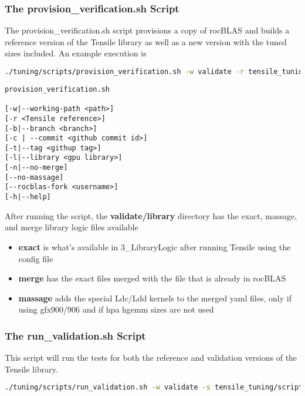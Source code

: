 \documentclass[]{article}
\begin{document}
\subsubsection{The provision\_verification.sh Script}

The provision\_verification.sh script provisions a copy of rocBLAS and builds a reference version of the Tensile library as well as a new version with the tuned sizes included. An example execution is

\begin{lstlisting}[language=bash,breaklines=true]
./tuning/scripts/provision_verification.sh -w validate -r tensile_tuning/tensile/Tensile -l vega20
\end{lstlisting}

\begin{verbatim}
provision_verification.sh

[-w|--working-path <path>]
[-r <Tensile reference>]
[-b|--branch <branch>]
[-c | --commit <github commit id>]
[-t|--tag <githup tag>]
[-l|--library <gpu library>]
[-n|--no-merge]
[--no-massage]
[--rocblas-fork <username>]
[-h|--help]
\end{verbatim}

After running the script, the \textbf{validate/library} directory has the exact, massage, and merge library logic files available

\begin{itemize}
	\item \textbf{exact} is what's available in 3\_LibraryLogic after running Tensile using the config file
	\item \textbf{merge} has the exact files merged with the file that is already in rocBLAS
	\item \textbf{massage} adds the special Ldc/Ldd kernels to the merged yaml files, only if using gfx900/906 and if hpa hgemm sizes are not used
\end{itemize}

\subsubsection{The run\_validation.sh Script}

This script will run the tests for both the reference and validation versions of the Tensile library.

\begin{lstlisting}[language=bash,breaklines=true]
./tuning/scripts/run_validation.sh -w validate -s tensile_tuning/scripts
\end{lstlisting}
\end{document}
